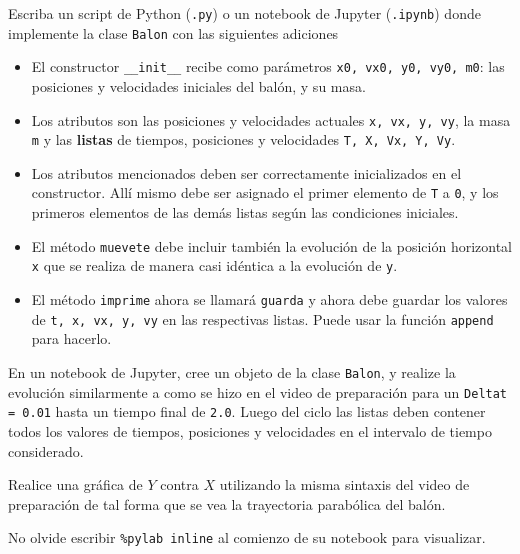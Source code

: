 \documentclass[11pt,letterpaper]{exam}
\begin{document}
\begin{questions}
 

Escriba un script de Python (\verb'.py') o un notebook de Jupyter (\verb".ipynb") donde implemente la clase \verb"Balon" con las siguientes adiciones

\begin{itemize}
\item El constructor \verb'__init__' recibe como par\'ametros \verb'x0, vx0, y0, vy0, m0': las posiciones y velocidades iniciales del bal\'on, y su masa.

\item Los atributos son las posiciones y velocidades actuales \verb'x, vx, y, vy', la masa \verb'm' y las \textbf{listas} de tiempos, posiciones y velocidades \verb'T, X, Vx, Y, Vy'.

\item Los atributos mencionados deben ser correctamente inicializados en el constructor. All\'i mismo debe ser asignado el primer elemento de \verb'T' a \verb'0', y los primeros elementos de las dem\'as listas seg\'un las condiciones iniciales.

\item El m\'etodo \verb'muevete' debe incluir tambi\'en la evoluci\'on de la posici\'on horizontal \verb'x' que se realiza de manera casi id\'entica a la evoluci\'on de \verb'y'.

\item El m\'etodo \verb'imprime' ahora se llamar\'a \verb'guarda' y ahora debe guardar los valores de \verb't, x, vx, y, vy' en las respectivas listas. Puede usar la funci\'on \verb'append' para hacerlo.
\end{itemize}

En un notebook de Jupyter, cree un objeto de la clase \verb'Balon', y realize la evoluci\'on similarmente a como se hizo en el video de preparaci\'on para un \verb'Deltat = 0.01' hasta un tiempo final de \verb'2.0'. Luego del ciclo las listas deben contener todos los valores de tiempos, posiciones y velocidades en el intervalo de tiempo considerado.


Realice una gr\'afica de $Y$ contra $X$ utilizando la misma sintaxis del video de preparaci\'on de tal forma que se vea la trayectoria parab\'olica del bal\'on.

No olvide escribir \verb'%pylab inline' al comienzo de su notebook para visualizar.

\end{questions}
\end{document}

